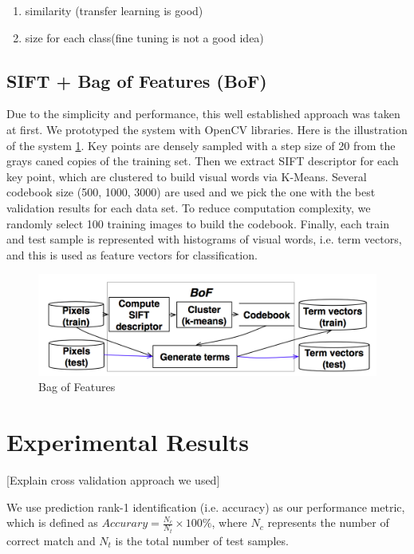 \documentclass[journal, 10pt]{IEEEtran}
\begin{document}
    \begin{enumerate}
      \item similarity (transfer learning is good)
      \item size for each class(fine tuning is not a good idea)
    \end{enumerate}

    \subsection{SIFT + Bag of Features (BoF) }
   Due to the simplicity and performance, this well established approach was taken at first.  We prototyped the system with OpenCV libraries.  Here is the illustration of the system \ref{fig:bofsystemdesign}.
 Key points are densely sampled with a step size of 20 from the grays caned copies of the training set. Then we extract SIFT descriptor for each key point, which are clustered to build visual words via K-Means. Several codebook size (500, 1000, 3000) are used and we pick the one with the best validation results for each data set. To reduce computation complexity, we randomly select 100 training images to build the codebook.  Finally, each train and test sample is represented with histograms of visual words, i.e. term vectors, and this is used as feature vectors for classification.
\begin{figure}
  \centering
  \includegraphics[width=1.00\linewidth]{bof}
  \caption{ Bag of Features }
  \label{fig:bofsystemdesign}
\end{figure}

\section{Experimental Results}
[Explain cross validation approach we used]

We use prediction rank-1 identification (i.e. accuracy) as our performance metric, which is defined as $Accurary = \frac{N_c}{N_t} \times 100 \%$, where $N_c$ represents the number of correct match and $N_t$ is the total number of test samples.
\end{document}
